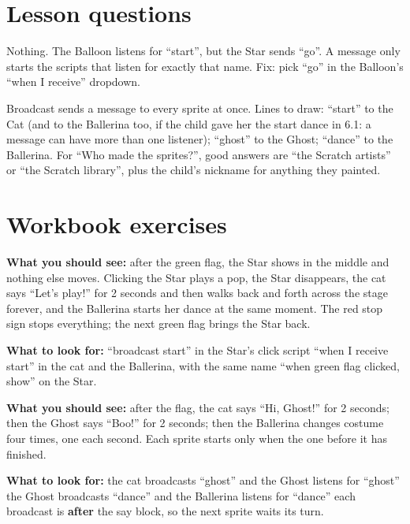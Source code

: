 
\section{Lesson questions}
\begin{answer}
Nothing. The Balloon listens for \enquote{start}, but the Star sends \enquote{go}. A message only starts the scripts that listen for exactly that name. Fix: pick \enquote{go} in the Balloon's \enquote{when I receive} dropdown.
\end{answer}

\begin{answer}[Reflection]
Broadcast sends a message to every sprite at once. Lines to draw: \enquote{start} to the Cat (and to the Ballerina too, if the child gave her the start dance in 6.1: a message can have more than one listener); \enquote{ghost} to the Ghost; \enquote{dance} to the Ballerina. For \enquote{Who made the sprites?}, good answers are \enquote{the Scratch artists} or \enquote{the Scratch library}, plus the child's nickname for anything they painted.
\end{answer}

\section{Workbook exercises}
\begin{answer}
\textbf{What you should see:} after the green flag, the Star shows in the middle and nothing else moves. Clicking the Star plays a pop, the Star disappears, the cat says \enquote{Let's play!} for 2 seconds and then walks back and forth across the stage forever, and the Ballerina starts her dance at the same moment. The red stop sign stops everything; the next green flag brings the Star back.

\textbf{What to look for:} \tickbox{} \enquote{broadcast start} in the Star's click script \quad \tickbox{} \enquote{when I receive start} in the cat and the Ballerina, with the same name \quad \tickbox{} \enquote{when green flag clicked, show} on the Star.
\end{answer}

\begin{answer}
\textbf{What you should see:} after the flag, the cat says \enquote{Hi, Ghost!} for 2 seconds; then the Ghost says \enquote{Boo!} for 2 seconds; then the Ballerina changes costume four times, one each second. Each sprite starts only when the one before it has finished.

\textbf{What to look for:} \tickbox{} the cat broadcasts \enquote{ghost} and the Ghost listens for \enquote{ghost} \quad \tickbox{} the Ghost broadcasts \enquote{dance} and the Ballerina listens for \enquote{dance} \quad \tickbox{} each broadcast is \textbf{after} the say block, so the next sprite waits its turn.
\end{answer}

